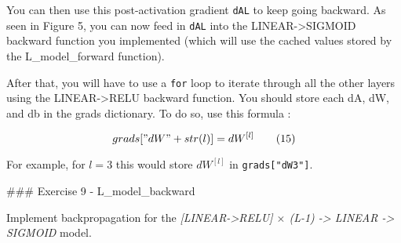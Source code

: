 \documentclass[11pt]{article}
\begin{document}
You can then use this post-activation gradient \texttt{dAL} to keep
going backward. As seen in Figure 5, you can now feed in \texttt{dAL}
into the LINEAR-\textgreater SIGMOID backward function you implemented
(which will use the cached values stored by the L\_model\_forward
function).

After that, you will have to use a \texttt{for} loop to iterate through
all the other layers using the LINEAR-\textgreater RELU backward
function. You should store each dA, dW, and db in the grads dictionary.
To do so, use this formula :

\[grads["dW" + str(l)] = dW^{[l]}\tag{15} \]

For example, for \(l=3\) this would store \(dW^{[l]}\) in
\texttt{grads{[}"dW3"{]}}.

\#\#\# Exercise 9 - L\_model\_backward

Implement backpropagation for the \emph{{[}LINEAR-\textgreater RELU{]}
\(\times\) (L-1) -\textgreater{} LINEAR -\textgreater{} SIGMOID} model.
\end{document}
